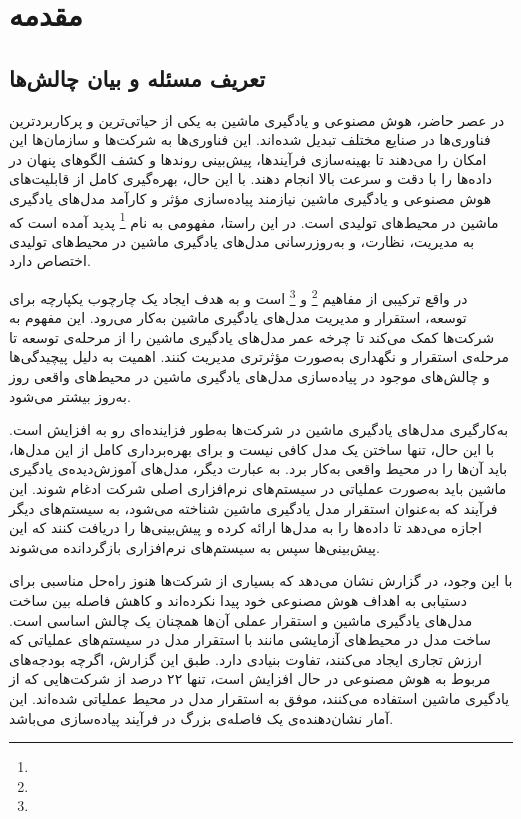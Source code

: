 \chapter{مقدمه} \label{ch:Introduction}

\section{تعریف مسئله و بیان چالش‌ها}
در عصر حاضر، هوش مصنوعی و یادگیری ماشین به یکی از حیاتی‌ترین و پرکاربردترین فناوری‌ها در صنایع مختلف تبدیل شده‌اند. این فناوری‌ها به شرکت‌ها و سازمان‌ها این امکان را می‌دهند تا بهینه‌سازی فرآیندها، پیش‌بینی روندها و کشف الگوهای پنهان در داده‌ها را با دقت و سرعت بالا انجام دهند. با این حال، بهره‌گیری کامل از قابلیت‌های هوش مصنوعی و یادگیری ماشین نیازمند پیاده‌سازی مؤثر و کارآمد مدل‌های یادگیری ماشین در محیط‌های تولیدی است. در این راستا، مفهومی به نام \footnote{} پدید آمده است که به مدیریت، نظارت، و به‌روزرسانی مدل‌های یادگیری ماشین در محیط‌های تولیدی اختصاص دارد.

در واقع ترکیبی از مفاهیم \footnote{} و \footnote{} است و به هدف ایجاد یک چارچوب یکپارچه برای توسعه، استقرار و مدیریت مدل‌های یادگیری ماشین به‌کار می‌رود. این مفهوم به شرکت‌ها کمک می‌کند تا چرخه‌ عمر مدل‌های یادگیری ماشین را از مرحله‌ی توسعه تا مرحله‌ی استقرار و نگهداری به‌صورت مؤثرتری مدیریت کنند. اهمیت  به دلیل پیچیدگی‌ها و چالش‌های موجود در پیاده‌سازی مدل‌های یادگیری ماشین در محیط‌های واقعی روز به‌روز بیشتر می‌شود.

به‌کارگیری مدل‌های یادگیری ماشین در شرکت‌ها به‌طور فزاینده‌ای رو به افزایش است. با این حال، تنها ساختن یک مدل کافی نیست و برای بهره‌برداری کامل از این مدل‌ها، باید آن‌ها را در محیط واقعی به‌کار برد. به عبارت دیگر، مدل‌های آموزش‌دیده‌ی یادگیری ماشین باید به‌صورت عملیاتی در سیستم‌های نرم‌افزاری اصلی شرکت ادغام شوند. این فرآیند که به‌عنوان استقرار مدل یادگیری ماشین شناخته می‌شود، به سیستم‌های دیگر اجازه می‌دهد تا داده‌ها را به مدل‌ها ارائه کرده و پیش‌بینی‌ها را دریافت کنند که این پیش‌بینی‌ها سپس به سیستم‌های نرم‌افزاری بازگردانده می‌شوند.

با این وجود، در گزارش \cite{algorithmiaMLState} نشان می‌دهد که بسیاری از شرکت‌ها هنوز راه‌حل مناسبی برای دستیابی به اهداف هوش مصنوعی خود پیدا نکرده‌اند و کاهش فاصله بین ساخت مدل‌های یادگیری ماشین و استقرار عملی آن‌ها همچنان یک چالش اساسی است. ساخت مدل در محیط‌های آزمایشی مانند  با استقرار مدل در سیستم‌های عملیاتی که ارزش تجاری ایجاد می‌کنند، تفاوت بنیادی دارد. طبق این گزارش، اگرچه بودجه‌های مربوط به هوش مصنوعی در حال افزایش است، تنها ۲۲ درصد از شرکت‌هایی که از یادگیری ماشین استفاده می‌کنند، موفق به استقرار مدل در محیط عملیاتی شده‌اند. این آمار نشان‌دهنده‌ی یک فاصله‌ی بزرگ در فرآیند پیاده‌سازی می‌باشد.

